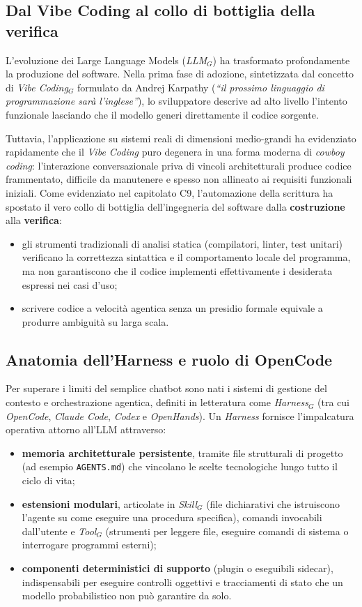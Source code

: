 \documentclass[a4paper, 11pt]{article}
\newcommand{\term}[1]{\textit{#1}$_G$} %
\begin{document}
\subsection{Dal Vibe Coding al collo di bottiglia della verifica}
L'evoluzione dei Large Language Models (\term{LLM}) ha trasformato profondamente la produzione del software. Nella prima fase di adozione, sintetizzata dal concetto di \term{Vibe Coding} formulato da Andrej Karpathy (\textit{``il prossimo linguaggio di programmazione sarà l'inglese''}), lo sviluppatore descrive ad alto livello l'intento funzionale lasciando che il modello generi direttamente il codice sorgente.

Tuttavia, l'applicazione su sistemi reali di dimensioni medio-grandi ha evidenziato rapidamente che il \textit{Vibe Coding} puro degenera in una forma moderna di \textit{cowboy coding}: l'interazione conversazionale priva di vincoli architetturali produce codice frammentato, difficile da manutenere e spesso non allineato ai requisiti funzionali iniziali. Come evidenziato nel capitolato C9, l'automazione della scrittura ha spostato il vero collo di bottiglia dell'ingegneria del software dalla \textbf{costruzione} alla \textbf{verifica}:
\begin{itemize}[noitemsep]
    \item gli strumenti tradizionali di analisi statica (compilatori, linter, test unitari) verificano la correttezza sintattica e il comportamento locale del programma, ma non garantiscono che il codice implementi effettivamente i desiderata espressi nei casi d'uso;
    \item scrivere codice a velocità agentica senza un presidio formale equivale a produrre ambiguità su larga scala.
\end{itemize}

\subsection{Anatomia dell'Harness e ruolo di OpenCode}
Per superare i limiti del semplice chatbot sono nati i sistemi di gestione del contesto e orchestrazione agentica, definiti in letteratura come \term{Harness} (tra cui \textit{OpenCode}, \textit{Claude Code}, \textit{Codex} e \textit{OpenHands}). Un \textit{Harness} fornisce l'impalcatura operativa attorno all'LLM attraverso:
\begin{itemize}[noitemsep]
    \item \textbf{memoria architetturale persistente}, tramite file strutturali di progetto (ad esempio \texttt{AGENTS.md}) che vincolano le scelte tecnologiche lungo tutto il ciclo di vita;
    \item \textbf{estensioni modulari}, articolate in \term{Skill} (file dichiarativi che istruiscono l'agente su come eseguire una procedura specifica), comandi invocabili dall'utente e \term{Tool} (strumenti per leggere file, eseguire comandi di sistema o interrogare programmi esterni);
    \item \textbf{componenti deterministici di supporto} (plugin o eseguibili sidecar), indispensabili per eseguire controlli oggettivi e tracciamenti di stato che un modello probabilistico non può garantire da solo.
\end{itemize}
\end{document}
